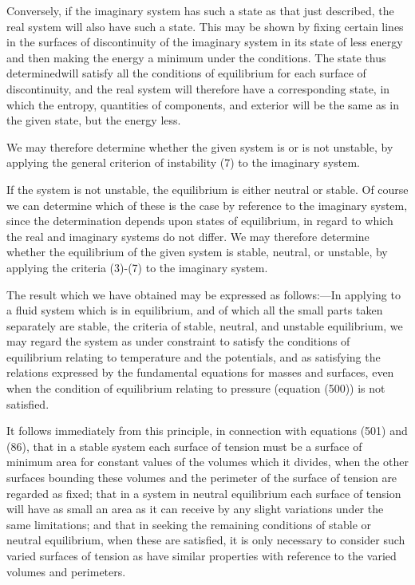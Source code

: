 \documentclass[12pt]{article}
\begin{document}
{Conversely, if the imaginary system has such a state as that just described, the real system will also have such a state. This may be shown by fixing certain lines in the surfaces of discontinuity of the imaginary system in its state of less energy and then making the energy a minimum under the conditions. The state thus determinedwill satisfy all the conditions of equilibrium for each surface of discontinuity, and the real system will therefore have a corresponding state, in which the entropy, quantities of components, and exterior will be the same as in the given state, but the energy less.

We may therefore determine whether the given system is or is not unstable, by applying the general criterion of instability (7) to the imaginary system.

If the system is not unstable, the equilibrium is either neutral or stable. Of course we can determine which of these is the case by reference to the imaginary system, since the determination depends upon states of equilibrium, in regard to which the real and imaginary systems do not differ. We may therefore determine whether the equilibrium of the given system is stable, neutral, or unstable, by applying the criteria (3)-(7) to the imaginary system.

The result which we have obtained may be expressed as follows:---In applying to a fluid system which is in equilibrium, and of which all the small parts taken separately are stable, the criteria of stable, neutral, and unstable equilibrium, we may regard the system as under constraint to satisfy the conditions of equilibrium relating to temperature and the potentials, and as satisfying the relations expressed by the fundamental equations for masses and surfaces, even when the condition of equilibrium relating to pressure (equation (500)) is not satisfied.

It follows immediately from this principle, in connection with equations (501) and (86), that in a stable system each surface of tension must be a surface of minimum area for constant values of the volumes which it divides, when the other surfaces bounding these volumes and the perimeter of the surface of tension are regarded as fixed; that in a system in neutral equilibrium each surface of tension will have as small an area as it can receive by any slight variations under the same limitations; and that in seeking the remaining conditions of stable or neutral equilibrium, when these are satisfied, it is only necessary to consider such varied surfaces of tension as have similar properties with reference to the varied volumes and perimeters.

}
\end{document}
